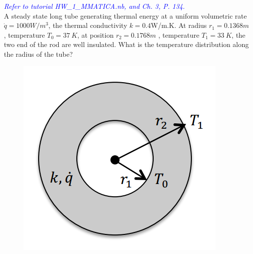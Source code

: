 \begin{example}
\label{example:24}
\textcolor{blue} {\emph{Refer to tutorial HW\_1\_MMATICA.nb, and Ch. 3, P. 134.}}
~\\
A steady state long tube generating thermal energy at a uniform volumetric rate
$\dot{q}=1000W/m^3$, the thermal conductivity $k=0.4$W/m.K.
At radius $r_1=0.1368m$, temperature $T_0=37~K$, at position $r_2=0.1768m$
, temperature $T_1=33~K$, the two end of the rod are well insulated.
What is the temperature distribution along the radius of the tube?
\begin{figure}[h!]
  \centering
    \includegraphics[scale=0.6]{figures/ch2/8}
\end{figure}
\end{example}

